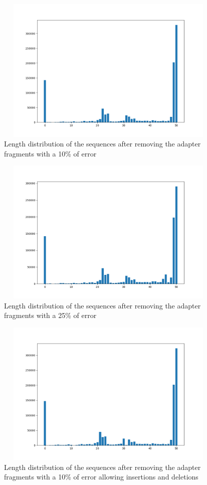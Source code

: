 \documentclass[a4paper,10pt]{article}
\begin{document}
\begin{figure}[H]
    \centering
    \includegraphics[width=11cm, height=7cm]{images/length-distr-10.png}
    \caption{Length distribution of the sequences after removing the adapter fragments with a 10\% of error}
    \label{length-distr-10}
\end{figure}

\begin{figure}[H]
    \centering
    \includegraphics[width=11cm, height=7cm]{images/length-distr-25.png}
    \caption{Length distribution of the sequences after removing the adapter fragments with a 25\% of error}
    \label{length-distr-25}
\end{figure}

\begin{figure}[H]
    \centering
    \includegraphics[width=11cm, height=7cm]{images/length-distr-10-id.png}
    \caption{Length distribution of the sequences after removing the adapter fragments with a 10\% of error allowing insertions and deletions}
    \label{length-distr-10-id}
\end{figure}
\end{document}
